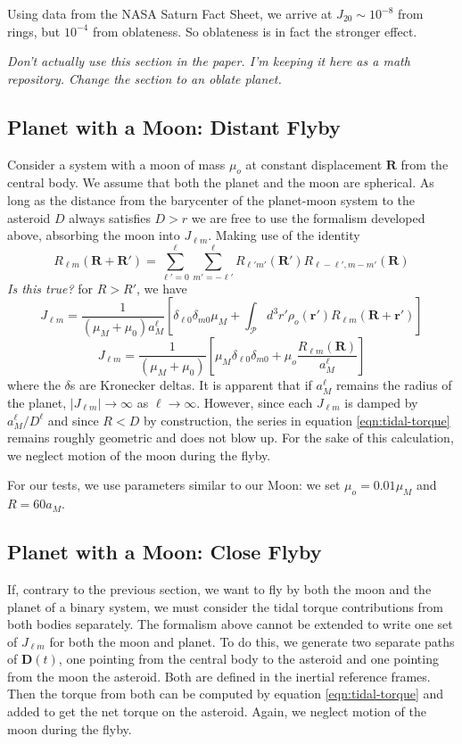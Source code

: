 \documentclass{aastex631}
\newcommand{\brackets}[1]{\left[ #1 \right]}
\newcommand{\jtd}[1]{{\color{red}\textit{#1}}}
\begin{document}
Using data from the NASA Saturn Fact Sheet, we arrive at $J_{20}\sim 10^{-8}$ from rings, but $10^{-4}$ from oblateness. So oblateness is in fact the stronger effect.

\jtd{Don't actually use this section in the paper. I'm keeping it here as a math repository. Change the section to an oblate planet.}

\subsection{Planet with a Moon: Distant Flyby}
Consider a system with a moon of mass $\mu_{o}$ at constant displacement $\bm R$ from the central body. We assume that both the planet and the moon are spherical. As long as the distance from the barycenter of the planet-moon system to the asteroid $D$ always satisfies $D>r$ we are free to use the formalism developed above, absorbing the moon into $J_{\ell m}$. Making use of the identity \cite{Gelderen1998TheSO}
\begin{equation}
R_{\ell m}(\bm R + \bm R') = \sum_{\ell' = 0}^\ell \sum_{m'=-\ell'}^\ell R_{\ell' m'}(\bm R') R_{\ell-\ell', m-m'}(\bm R)
\end{equation}
\jtd{Is this true?}
for $R > R'$, we have
\begin{equation}
J_{\ell m} = \frac{1}{(\mu_M+\mu_0) a_M^\ell}\brackets{\delta_{\ell 0}\delta_{m0}\mu_M + \int_\mathcal{P} d^3 r' \rho_o(\bm r') R_{\ell m}(\bm R + \bm r')}
\end{equation}
\begin{equation}
J_{\ell m} = \frac{1}{(\mu_M+\mu_0)}\brackets{\mu_M\delta_{\ell 0}\delta_{m0} + \mu_o \frac{R_{\ell m}(\bm R)}{ a_M^\ell}}
\end{equation}
where the $\delta$s are Kronecker deltas. It is apparent that if $a_M^\ell$ remains the radius of the planet, $|J_{\ell m}| \rightarrow \infty$ as $\ell \rightarrow \infty$. However, since each $J_{\ell m}$ is damped by $a_M^\ell / D^\ell$ and since $R < D$ by construction, the series in equation \ref{eqn:tidal-torque} remains roughly geometric and does not blow up. For the sake of this calculation, we neglect motion of the moon during the flyby.

For our tests, we use parameters similar to our Moon: we set $\mu_o = 0.01 \mu_M$ and $R = 60 a_M$.


\subsection{Planet with a Moon: Close Flyby}
If, contrary to the previous section, we want to fly by both the moon and the planet of a binary system, we must consider the tidal torque contributions from both bodies separately. The formalism above cannot be extended to write one set of $J_{\ell m}$ for both the moon and planet. To do this, we generate two separate paths of $\bm D(t)$, one pointing from the central body to the asteroid and one pointing from the moon the asteroid. Both are defined in the inertial reference frames. Then the torque from both can be computed by equation \ref{eqn:tidal-torque} and added to get the net torque on the asteroid. Again, we neglect motion of the moon during the flyby.
\end{document}

